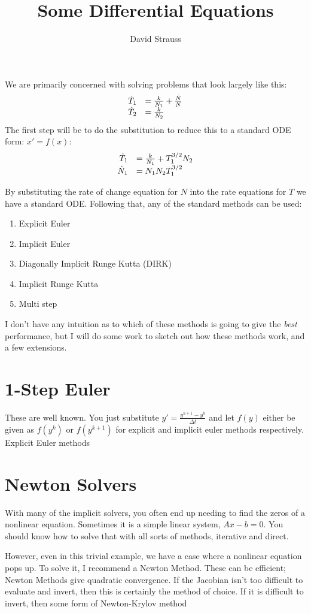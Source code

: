 \documentclass{article}
\title{Some Differential Equations}
\author{David Strauss}
\begin{document}
\maketitle
We are primarily concerned with solving problems that look largely like this:
\begin{equation}
\begin{array}{r l}
\dot{T}_1 & = \frac{k}{N_1} + \frac{\dot{N}}{N}\\
\dot{T}_2 & = \frac{k}{N_2}
\end{array}
\end{equation}
The first step will be to do the substitution to reduce this to a standard ODE form: $x' = f(x)$:
\begin{equation}
\begin{array}{r l}
\dot{T}_1 &= \frac{k}{N_1} + T_1^{3/2}N_2\\
\dot{N}_1 &= N_1N_2T_1^{3/2}\end{array}
\end{equation}

By substituting the rate of change equation for $N$ into the rate equations for $T$ we have a standard ODE. Following that, any of the standard methods can be used:
\begin{enumerate}
\item Explicit Euler
\item Implicit Euler
\item Diagonally Implicit Runge Kutta (DIRK)
\item Implicit Runge Kutta 
\item Multi step
\end{enumerate}

I don't have any intuition as to which of these methods is going to give the \emph{best} performance, but I will do some work to sketch out how these methods work, and a few extensions.

\section{1-Step Euler}
These are well known. You just substitute $y' = \frac{y^{k+1} - y^k}{\Delta t}$ and let $f(y)$ either be given as $f(y^k)$ or $f(y^{k+1})$ for explicit and implicit euler methods respectively. Explicit Euler methods 


\section{Newton Solvers}
With many of the implicit solvers, you often end up needing to find the zeros of a nonlinear equation. Sometimes it is a simple linear system, $Ax-b=0$. You should know how to solve that with all sorts of methods, iterative and direct.

However, even in this trivial example, we have a case where a nonlinear equation pops up. To solve it, I recommend a Newton Method. These can be efficient; Newton Methods give quadratic convergence. If the Jacobian isn't too difficult to evaluate and invert, then this is certainly the method of choice. If it is difficult to invert, then some form of Newton-Krylov method 
\end{document}
